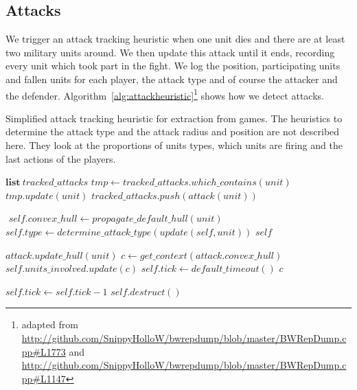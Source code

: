 \subsection{Attacks}
We trigger an attack tracking heuristic when one unit dies and there are at least two military units around. We then update this attack until it ends, recording every unit which took part in the fight. We log the position, participating units and fallen units for each player, the attack type and of course the attacker and the defender. Algorithm~\ref{alg:attackheuristic}\footnote{adapted from \url{http://github.com/SnippyHolloW/bwrepdump/blob/master/BWRepDump.cpp\#L1773} and \url{http://github.com/SnippyHolloW/bwrepdump/blob/master/BWRepDump.cpp\#L1147}} shows how we detect attacks.
\begin{algorithm}
\caption{Simplified attack tracking heuristic for extraction from games. The heuristics to determine the attack type and the attack radius and position are not described here. They look at the proportions of units types, which units are firing and the last actions of the players.}
\label{alg:attackheuristic}
\begin{algorithmic}
\State $\mathrm{\textbf{list}}\ tracked\_attacks$
    \State $tmp \leftarrow tracked\_attacks.which\_contains(unit)$
        \State $tmp.update(unit)$ 
    \Else
        \State $tracked\_attacks.push(attack(unit))$
    \EndIf
\EndFunction

 
    \State $ $ 
    \State $self.convex\_hull \leftarrow propagate\_default\_hull(unit)$ 
    \State $self.type \leftarrow determine\_attack\_type(update(self, unit))$
    \State \Return $self$
\EndFunction

    \State $attack.update\_hull(unit)$ 
    \State $c \leftarrow get\_context(attack.convex\_hull)$
    \State $self.units\_involved.update(c)$ 
    \State $self.tick \leftarrow default\_timeout()$
    \State \Return $c$
\EndFunction

    \State $self.tick \leftarrow self.tick - 1$
        \State $self.destruct()$
    \EndIf
\EndFunction
\end{algorithmic}
\end{algorithm}


